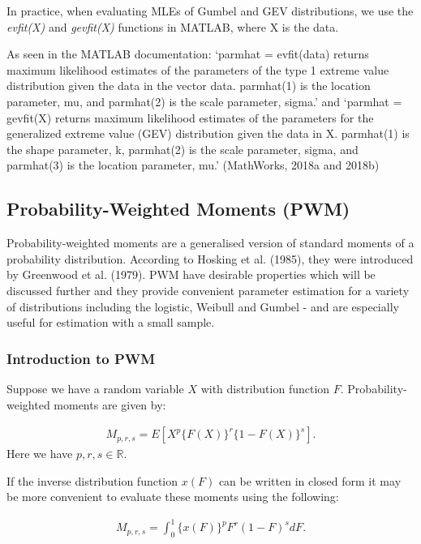 \documentclass{article}
\begin{document}
In practice, when evaluating MLEs of Gumbel and GEV distributions, we use the \textit{evfit(X)} and \textit{gevfit(X)} functions in MATLAB, where X is the data.

As seen in the MATLAB documentation: `parmhat = evfit(data) returns maximum likelihood estimates of the parameters of the type 1 extreme value distribution given the data in the vector data. parmhat(1) is the location parameter, mu, and parmhat(2) is the scale parameter, sigma.' and `parmhat = gevfit(X) returns maximum likelihood estimates of the parameters for the generalized extreme value (GEV) distribution given the data in X. parmhat(1) is the shape parameter, k, parmhat(2) is the scale parameter, sigma, and parmhat(3) is the location parameter, mu.' (MathWorks, 2018a and 2018b)

\subsection{Probability-Weighted Moments (PWM)}

Probability-weighted moments are a generalised version of standard moments of a probability distribution. According to Hosking et al. (1985), they were introduced by Greenwood et al. (1979). PWM have desirable properties which will be discussed further and they provide convenient parameter estimation for a variety of distributions including the logistic, Weibull and Gumbel - and are especially useful for estimation with a small sample.

\subsubsection{Introduction to PWM}
Suppose we have a random variable $X$ with distribution function $F$. Probability-weighted moments are given by:

\begin{align}
M_{p,r,s} = E[X^p\{F(X)\}^r\{1 - F(X)\}^s].
\end{align}
Here we have $p, r, s \in \mathbb{R} $. 

If the inverse distribution function $x(F)$ can be written in closed form it may be more convenient to evaluate these moments using the following:

\begin{align}
M_{p,r,s} = \int_{0}^{1} \{x(F)\}^p F^r (1-F)^s dF.
\end{align}
\end{document}
